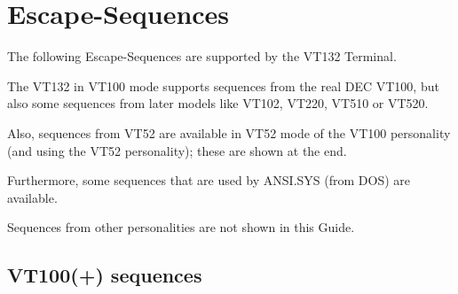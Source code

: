 \chapter{Escape-Sequences}

The following Escape-Sequences are supported by the VT132 Terminal.

The VT132 in VT100 mode supports sequences from the real DEC VT100, but also some sequences from later models like
VT102, VT220, VT510 or VT520.

Also, sequences from VT52 are available in VT52 mode of the VT100 personality (and using the VT52 personality); these are shown at the end.

Furthermore, some sequences that are used by ANSI.SYS (from DOS) are available.

Sequences from other personalities are not shown in this Guide.

\newpage
\section{VT100(+) sequences}

